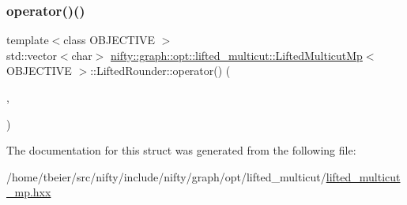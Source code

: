 \subsubsection{\texorpdfstring{operator()()}{operator()()}\hspace{0.1cm}{\footnotesize\ttfamily [2/2]}}
{\footnotesize\ttfamily template$<$class O\+B\+J\+E\+C\+T\+I\+VE $>$ \\
std\+::vector$<$char$>$ \hyperlink{classnifty_1_1graph_1_1opt_1_1lifted__multicut_1_1LiftedMulticutMp}{nifty\+::graph\+::opt\+::lifted\+\_\+multicut\+::\+Lifted\+Multicut\+Mp}$<$ O\+B\+J\+E\+C\+T\+I\+VE $>$\+::Lifted\+Rounder\+::operator() (\begin{DoxyParamCaption}\item[{\hyperlink{structnifty_1_1graph_1_1opt_1_1lifted__multicut_1_1LiftedMulticutMp_1_1LiftedRounder_ab554fdcb105127764221d744665a12fc}{Graph\+Type} \&\&}]{,  }\item[{std\+::vector$<$ double $>$ \&\&}]{ }\end{DoxyParamCaption})\hspace{0.3cm}{\ttfamily [inline]}}



The documentation for this struct was generated from the following file\+:\begin{DoxyCompactItemize}
\item 
/home/tbeier/src/nifty/include/nifty/graph/opt/lifted\+\_\+multicut/\hyperlink{lifted__multicut__mp_8hxx}{lifted\+\_\+multicut\+\_\+mp.\+hxx}\end{DoxyCompactItemize}
